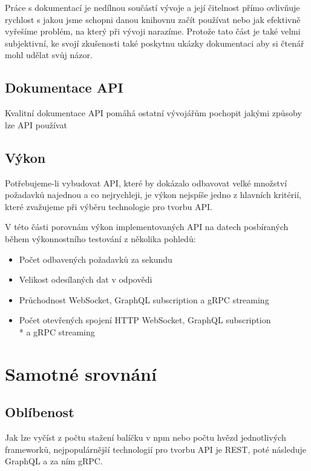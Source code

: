 \documentclass[thesis=M,czech]{FITthesis}[2019/12/23]
\begin{document}
Práce s dokumentací je nedílnou součástí vývoje a její čitelnost přímo ovlivňuje rychlost s jakou jsme schopni danou knihovnu začít používat nebo jak efektivně vyřešíme problém, na který při vývoji narazíme. Protože tato část je také velmi subjektivní, ke svojí zkušenosti také poskytnu ukázky dokumentaci aby si čtenář mohl udělat svůj názor. 

\subsection{Dokumentace API}
Kvalitní dokumentace API pomáhá ostatní vývojářům pochopit jakými způsoby lze API používat

\subsection{Výkon}
Potřebujeme-li vybudovat API, které by dokázalo odbavovat velké množství požadavků najednou a co nejrychleji, je výkon nejspíše jedno z hlavních kritérií, které zvažujeme při výběru technologie pro tvorbu API.

V této části porovnám výkon implementovaných API na datech posbíraných během výkonnostního testování z několika pohledů:

\begin{itemize}
    \item Počet odbavených požadavků za sekundu
    \item Velikost odesílaných dat v odpovědi
    \item Průchodnost WebSocket, GraphQL subscription a gRPC streaming
    \item Počet otevřených spojení HTTP WebSocket, GraphQL subscription \\* a gRPC streaming
\end{itemize}

\section{Samotné srovnání}

\subsection{Oblíbenost}
Jak lze vyčíst z počtu stažení balíčku v npm nebo počtu hvězd jednotlivých frameworků, nejpopulárnější technologií pro tvorbu API je REST, poté následuje GraphQL a za ním gRPC.
\end{document}
